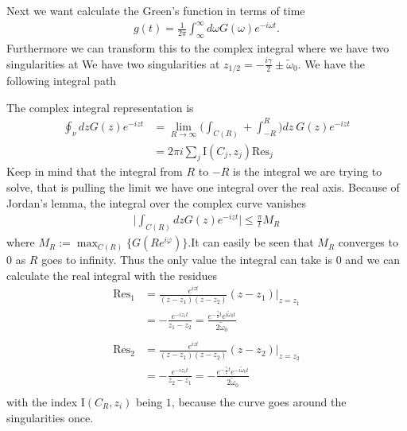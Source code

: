 \documentclass[a4paper]{article}
\begin{document}
Next we want calculate the Green's function in terms of time
\begin{align}
    g(t) = \frac{1}{2\pi} \int^\infty_\infty d\omega G(\omega)e^{-i\omega t}.
\end{align}
Furthermore we can transform this to the complex integral where we have two singularities
at We have two singularities at $z_{1/2} =  - \frac{i\gamma}{2} \pm
\tilde{\omega}_{0}$. We have the following integral
path

\begin{center}
\end{center}

The complex integral representation is
\begin{align}
    \oint_\nu dz G(z) e^{-izt} &=
     \lim_{R \rightarrow \infty }
     \bigg(
    \int_{C(R)} + \int_{-R}^{R}
    \bigg)
    dz\ G(z) e^{-izt}\\
    &= 2\pi i\sum_j \text{I}(C_j, z_j) \text{Res}_j
\end{align}
Keep in mind that the integral from $R$ to $-R$ is the integral we are
trying to solve, that is pulling the limit we have one integral over the real
axis. Because of Jordan's lemma, the integral over the complex curve vanishes
\begin{align}
    \big| \int_{C(R)} dz G(z) e^{-izt}\big| \leq \frac{\pi}{t}M_R
\end{align}
where $M_R:= \max_{C(R)}\{G(Re^{i\varphi})\}$.It can easily be seen that $M_R$
converges to $0$ as $R$ goes to infinity. Thus the only value the integral can
take is $0$ and we can calculate the real integral with the residues
\begin{align}
    \text{Res}_1 &= \frac{e^{i z t}}{(z - z_1)(z - z_2)} (z - z_1)\bigg|_{z=z_1}
    \\
    &= -\frac{e^{-iz_1t}}{z_1 - z_2} = \frac{e^{-\frac{\gamma}{2}t}
    e^{i\tilde{\omega}_0 t}}{2\tilde{\omega}_0}\\
    \nonumber \\
    \text{Res}_2 &= \frac{e^{i z t}}{(z - z_1)(z - z_2)} (z - z_2)\bigg|_{z=z_2}
    \\
    &= -\frac{e^{-iz_1t}}{z_2 - z_1} = -\frac{e^{-\frac{\gamma}{2}t}
    e^{-i\tilde{\omega}_0 t}}{2\tilde{\omega}_0}\\
\end{align}
with the index $\text{I}(C_R, z_i)$ being $1$, because the curve goes around the
singularities once.
\end{document}
